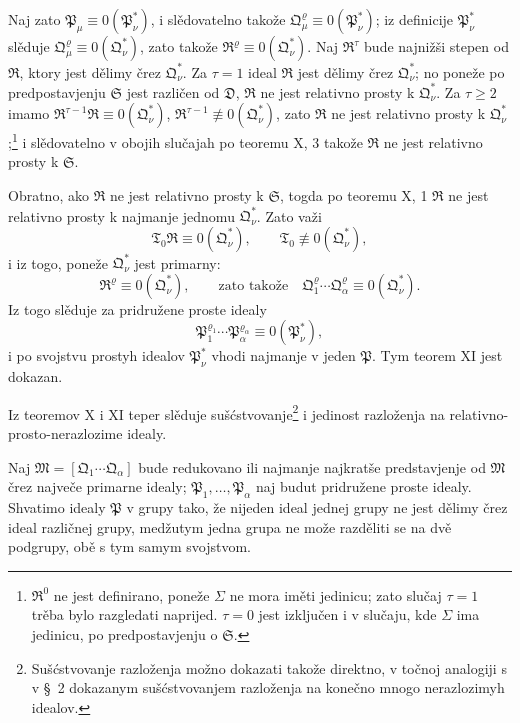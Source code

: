 \documentclass[11pt]{article}
\newcommand{\ideal}[1]{\mathfrak{#1}}
\begin{document}
Naj zato \(\ideal P_\mu\equiv0(\ideal P_\nu^*)\), i slědovatelno takože \(\ideal Q_\mu^{\varrho}\equiv0(\ideal P_\nu^*)\); iz definicije \(\ideal P_\nu^*\) slěduje \(\ideal Q_\mu^{\varrho}\equiv0(\ideal Q_\nu^*)\), zato takože \(\ideal R^{\varrho}\equiv0(\ideal Q_\nu^*)\). Naj \(\ideal R^\tau\) bude najnižši stepen od \(\ideal R\), ktory jest dělimy črez \(\ideal Q_\nu^*\). Za \(\tau=1\) ideal \(\ideal R\) jest dělimy črez \(\ideal Q_\nu^*\); no poneže po predpostavjenju \(\ideal S\) jest različen od \(\ideal D\), \(\ideal R\) ne jest relativno prosty k \(\ideal Q_\nu^*\). Za \(\tau\ge2\) imamo \(\ideal R^{\tau-1}\ideal R\equiv0(\ideal Q_\nu^*)\), \(\ideal R^{\tau-1}\not\equiv0(\ideal Q_\nu^*)\), zato \(\ideal R\) ne jest relativno prosty k \(\ideal Q_\nu^*\);\footnote{\(\ideal R^0\) ne jest definirano, poneže \(\Sigma\) ne mora iměti jedinicu; zato slučaj \(\tau=1\) trěba bylo razgledati naprijed. \(\tau=0\) jest izključen i v slučaju, kde \(\Sigma\) ima jedinicu, po predpostavjenju o \(\ideal S\).} i slědovatelno v obojih slučajah po teoremu X, 3 takože \(\ideal R\) ne jest relativno prosty k \(\ideal S\).

Obratno, ako \(\ideal R\) ne jest relativno prosty k \(\ideal S\), togda po teoremu X, 1 \(\ideal R\) ne jest relativno prosty k najmanje jednomu \(\ideal Q_\nu^*\). Zato važi
\[
 \ideal T_0\ideal R\equiv0(\ideal Q_\nu^*),\qquad
 \ideal T_0\not\equiv0(\ideal Q_\nu^*),
\]
i iz togo, poneže \(\ideal Q_\nu^*\) jest primarny:
\[
 \ideal R^\varrho\equiv0(\ideal Q_\nu^*),\qquad
 \text{zato takože}\quad
 \ideal Q_1^{\varrho}\cdots\ideal Q_\alpha^{\varrho}\equiv0(\ideal Q_\nu^*).
\]
Iz togo slěduje za pridružene proste idealy
\[
 \ideal P_1^{\varrho_1}\cdots\ideal P_\alpha^{\varrho_\alpha}\equiv0(\ideal P_\nu^*),
\]
i po svojstvu prostyh idealov \(\ideal P_\nu^*\) vhodi najmanje v jeden \(\ideal P\). Tym teorem XI jest dokazan.

Iz teoremov X i XI teper slěduje sušćstvovanje\footnote{Sušćstvovanje razloženja možno dokazati takože direktno, v točnoj analogiji s v \S~2 dokazanym sušćstvovanjem razloženja na konečno mnogo nerazlozimyh idealov.} i jedinost razloženja na relativno-prosto-nerazlozime idealy.

Naj \(\ideal M=[\ideal Q_1\cdots\ideal Q_\alpha]\) bude redukovano ili najmanje najkratše predstavjenje od \(\ideal M\) črez največe primarne idealy; \(\ideal P_1,\ldots,\ideal P_\alpha\) naj budut pridružene proste idealy. Shvatimo idealy \(\ideal P\) v grupy tako, že nijeden ideal jednej grupy ne jest dělimy črez ideal različnej grupy, medžutym jedna grupa ne može razděliti se na dvě podgrupy, obě s tym samym svojstvom.
\end{document}
